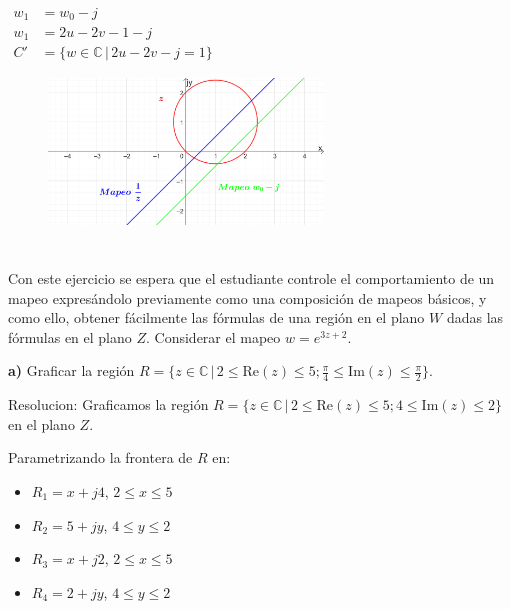 \documentclass[12pt]{report}
\begin{document}
\begin{math}
\begin{aligned}
    w_1 &= w_0-j \\[5pt]
    w_1 &= 2u-2v-1-j \\[5pt]
    C' &= \{w \in \mathbb{C} \, | \, 2u-2v-j=1\}
\end{aligned}
\end{math}

\begin{figure}[t] %
    \centering %
    \includegraphics[width=0.65\textwidth]{./Imagenes/foto2Ej3.png} %
\end{figure}


\chapter{}

Con este ejercicio se espera que el estudiante controle el comportamiento de un mapeo expresándolo previamente como una composición de mapeos básicos, y como ello, obtener fácilmente las fórmulas de una región en el plano $W$ dadas las fórmulas en el plano $Z$. Considerar el mapeo $w = e^{3z + 2}$.

\textbf{a)} Graficar la región $R = \{z \in \mathbb{C} \, | \, 2 \leq \text{Re}(z) \leq 5; \frac{\pi}{4} \leq \text{Im}(z) \leq \frac{\pi}{2}\}$.

Resolucion:
Graficamos la región $R = \{z \in \mathbb{C} \, | \, 2 \leq \text{Re}(z) \leq 5; 4 \leq \text{Im}(z) \leq 2\}$ en el plano $Z$.

Parametrizando la frontera de $R$ en:
\begin{itemize}
    \item $R_1 = x + j4$, $2 \leq x \leq 5$
    \item $R_2 = 5 + jy$, $4 \leq y \leq 2$
    \item $R_3 = x + j2$, $2 \leq x \leq 5$
    \item $R_4 = 2 + jy$, $4 \leq y \leq 2$
\end{itemize}
\end{document}
